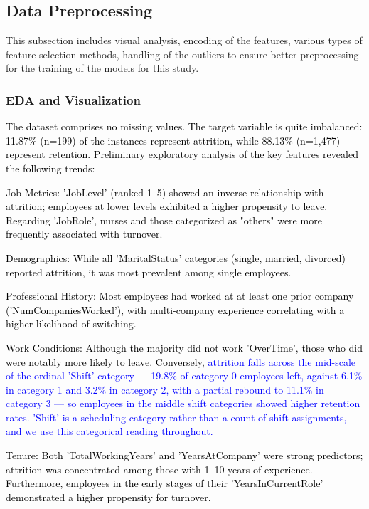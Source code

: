 \documentclass[a4paper,fleqn]{cas-sc}
\begin{document}
\subsection{Data Preprocessing}
This subsection includes visual analysis, encoding of the features, various types of feature selection methods, handling of the outliers to ensure better preprocessing for the training of the models for this study.

\subsubsection{EDA and Visualization}
\textcolor{black}{
The dataset \cite{KaggleHealthcareAttrition} comprises no missing values. The target variable is quite imbalanced: 11.87\% (n=199) of the instances represent attrition, while 88.13\% (n=1,477) represent retention. Preliminary exploratory analysis of the key features revealed the following trends:}

\textcolor{black}{Job Metrics: 'JobLevel' (ranked 1–5) showed an inverse relationship with attrition; employees at lower levels exhibited a higher propensity to leave. Regarding 'JobRole', nurses and those categorized as "others" were more frequently associated with turnover.}

\textcolor{black}{Demographics: While all 'MaritalStatus' categories (single, married, divorced) reported attrition, it was most prevalent among single employees.}

\textcolor{black}{Professional History: Most employees had worked at at least one prior company ('NumCompaniesWorked'), with multi-company experience correlating with a higher likelihood of switching.}

\textcolor{black}{Work Conditions: Although the majority did not work 'OverTime', those who did were notably more likely to leave. Conversely, \textcolor{blue}{attrition falls across the mid-scale of the ordinal 'Shift' category --- 19.8\% of category-0 employees left, against 6.1\% in category 1 and 3.2\% in category 2, with a partial rebound to 11.1\% in category 3 --- so employees in the middle shift categories showed higher retention rates. 'Shift' is a scheduling category rather than a count of shift assignments, and we use this categorical reading throughout.}}

\textcolor{black}{Tenure: Both 'TotalWorkingYears' and 'YearsAtCompany' were strong predictors; attrition was concentrated among those with 1–10 years of experience. Furthermore, employees in the early stages of their 'YearsInCurrentRole' demonstrated a higher propensity for turnover.}
\end{document}
